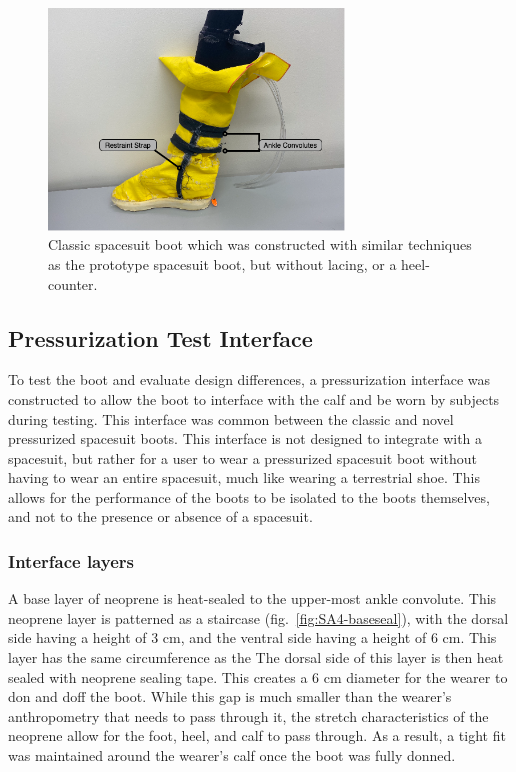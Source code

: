\documentclass[defaultstyle,11pt]{thesis}
\begin{document}
\hypertarget{fig:SA3-classic_boot}{%
\begin{figure}
\centering
\includegraphics[width=0.7\textwidth,height=\textheight]{../fig/SA3/Classic_Spaceboot.png}
\caption[{Classic spacesuit boot which was constructed with similar techniques as the prototype spacesuit boot}]{Classic spacesuit boot which was constructed with similar techniques as the prototype spacesuit boot, but without lacing, or a heel-counter.}
\label{fig:SA3-classic_boot}
\end{figure}
}

\hypertarget{pressurization-test-interface}{%
\subsection{Pressurization Test Interface}\label{pressurization-test-interface}}

To test the boot and evaluate design differences, a pressurization interface was constructed to allow the boot to interface with the calf and be worn by subjects during testing.
This interface was common between the classic and novel pressurized spacesuit boots.
This interface is not designed to integrate with a spacesuit, but rather for a user to wear a pressurized spacesuit boot without having to wear an entire spacesuit, much like wearing a terrestrial shoe.
This allows for the performance of the boots to be isolated to the boots themselves, and not to the presence or absence of a spacesuit.

\hypertarget{interface-layers}{%
\subsubsection{Interface layers}\label{interface-layers}}

A base layer of neoprene is heat-sealed to the upper-most ankle convolute.
This neoprene layer is patterned as a staircase (fig.~\ref{fig:SA4-baseseal}), with the dorsal side having a height of 3 cm, and the ventral side having a height of 6 cm.
This layer has the same circumference as the
The dorsal side of this layer is then heat sealed with neoprene sealing tape.
This creates a 6 cm diameter for the wearer to don and doff the boot.
While this gap is much smaller than the wearer's anthropometry that needs to pass through it, the stretch characteristics of the neoprene allow for the foot, heel, and calf to pass through.
As a result, a tight fit was maintained around the wearer's calf once the boot was fully donned.
\end{document}

